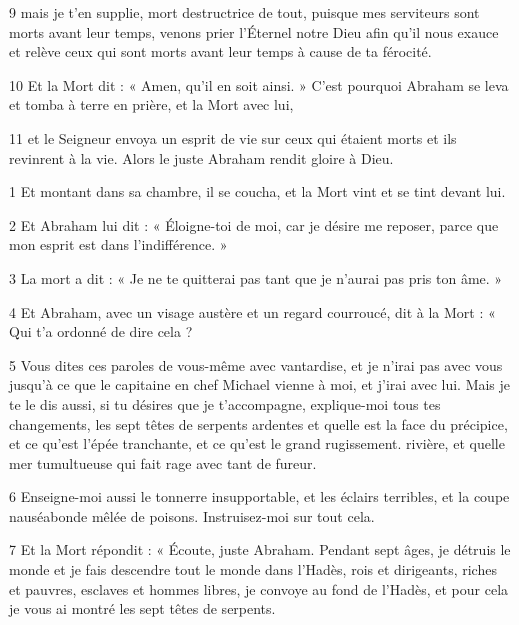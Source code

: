 \par 9 mais je t'en supplie, mort destructrice de tout, puisque mes serviteurs sont morts avant leur temps, venons prier l'Éternel notre Dieu afin qu'il nous exauce et relève ceux qui sont morts avant leur temps à cause de ta férocité.

\par 10 Et la Mort dit : « Amen, qu'il en soit ainsi. » C'est pourquoi Abraham se leva et tomba à terre en prière, et la Mort avec lui,

\par 11 et le Seigneur envoya un esprit de vie sur ceux qui étaient morts et ils revinrent à la vie. Alors le juste Abraham rendit gloire à Dieu.


\par 1 Et montant dans sa chambre, il se coucha, et la Mort vint et se tint devant lui.

\par 2 Et Abraham lui dit : « Éloigne-toi de moi, car je désire me reposer, parce que mon esprit est dans l'indifférence. »

\par 3 La mort a dit : « Je ne te quitterai pas tant que je n'aurai pas pris ton âme. »

\par 4 Et Abraham, avec un visage austère et un regard courroucé, dit à la Mort : « Qui t'a ordonné de dire cela ?

\par 5 Vous dites ces paroles de vous-même avec vantardise, et je n'irai pas avec vous jusqu'à ce que le capitaine en chef Michael vienne à moi, et j'irai avec lui. Mais je te le dis aussi, si tu désires que je t'accompagne, explique-moi tous tes changements, les sept têtes de serpents ardentes et quelle est la face du précipice, et ce qu'est l'épée tranchante, et ce qu'est le grand rugissement. rivière, et quelle mer tumultueuse qui fait rage avec tant de fureur.

\par 6 Enseigne-moi aussi le tonnerre insupportable, et les éclairs terribles, et la coupe nauséabonde mêlée de poisons. Instruisez-moi sur tout cela.

\par 7 Et la Mort répondit : « Écoute, juste Abraham. Pendant sept âges, je détruis le monde et je fais descendre tout le monde dans l'Hadès, rois et dirigeants, riches et pauvres, esclaves et hommes libres, je convoye au fond de l'Hadès, et pour cela je vous ai montré les sept têtes de serpents.

